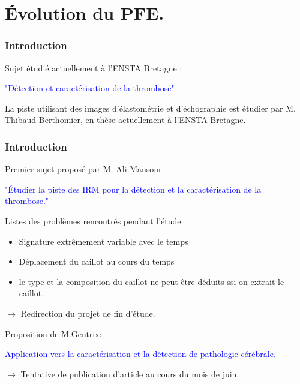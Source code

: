 \documentclass{beamer}
\begin{document}
\section{Évolution du PFE.}


\begin{frame}
\frametitle{Introduction}

Sujet étudié actuellement à l'ENSTA Bretagne :

\bigskip 

\begin{Large}
\textcolor{blue}{"Détection et caractérisation de la thrombose"}
\end{Large}

\bigskip 

La piste utilisant des images d'élastométrie et d'échographie est étudier par M. Thibaud Berthomier, en thèse actuellement à l'ENSTA Bretagne.

\end{frame}

\begin{frame}
\frametitle{Introduction}

Premier sujet proposé par M. Ali Mansour:

\bigskip 

\begin{Large}
\textcolor{blue}{"Étudier la piste des IRM pour la détection et la caractérisation de la thrombose."}
\end{Large}

\end{frame}

\begin{frame}[allowframebreaks]

Listes des problèmes rencontrés pendant l'étude:
\begin{itemize}
\item Signature extrêmement variable avec le temps
\item Déplacement du caillot au cours du temps
\item le type et la composition du caillot ne peut être déduits ssi on extrait le caillot.
\end{itemize}

\end{frame}

\begin{frame}[allowframebreaks]

\bigskip

$\rightarrow$ Redirection du projet de fin d'étude.

\bigskip
Proposition de M.Gentrix: 

\bigskip

\begin{Large}
\textcolor{blue}{Application vers la caractérisation et la détection de pathologie cérébrale.}
\end{Large}

$\rightarrow$ Tentative de publication d'article au cours du mois de juin.

\end{frame}
\end{document}

